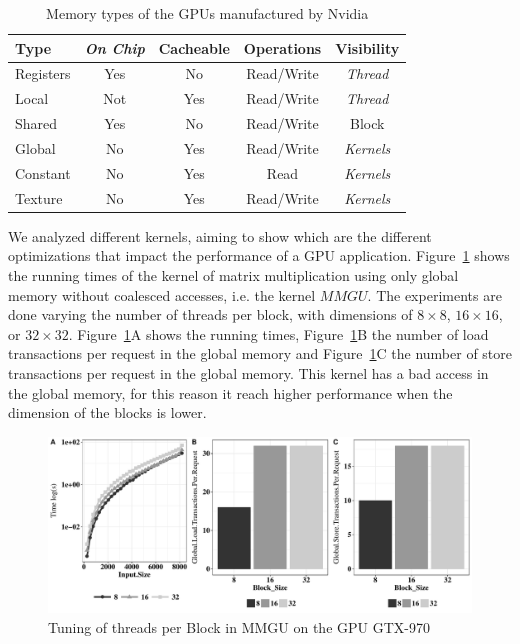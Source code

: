 \begin{table}[htpb]
\centering
\begin{tabular}{| l | c | c | c  |  c |} 
\hline \hline%
\textbf{Type} & \textit{\textbf{On Chip}}&\textbf{Cacheable}&\textbf{Operations}&\textbf{Visibility} \\ \hline
Registers&Yes&No&Read/Write&\textit{Thread}\\ \hline
Local&Not&Yes&Read/Write&\textit{Thread}\\ \hline
Shared&Yes&No&Read/Write&Block\\ \hline
Global&No&Yes&Read/Write&\textit{Kernels}\\ \hline
Constant&No&Yes&Read&\textit{Kernels}\\ \hline
Texture&No&Yes&Read/Write&\textit{Kernels}\\ \hline
\hline
\end{tabular}
\caption{Memory types of the GPUs manufactured by Nvidia}
\label{tab:memories} %
\end{table}

We analyzed different kernels, aiming to show which are the different optimizations that impact the performance of a GPU application. Figure~\ref{fig:BlockTunning} shows the running times of the kernel of matrix multiplication using only global memory without coalesced accesses, i.e. the kernel $MMGU$. The experiments are done varying the number of threads per block, with dimensions of $8\times{}8$, $16\times{}16$, or $32\times{}32$. Figure~\ref{fig:BlockTunning}A shows the running times, Figure~\ref{fig:BlockTunning}B the number of load transactions per request in the global memory and Figure~\ref{fig:BlockTunning}C the number of store transactions per request in the global memory. This kernel has a bad access in the global memory, for this reason it reach higher performance when the dimension of the blocks is lower.

\begin{figure}[htpb]
	\centering
    \includegraphics[scale=.5]{images/plotBlock.pdf}
    \caption{Tuning of threads per Block in MMGU on the GPU GTX-970}
    \label{fig:BlockTunning}
\end{figure}

